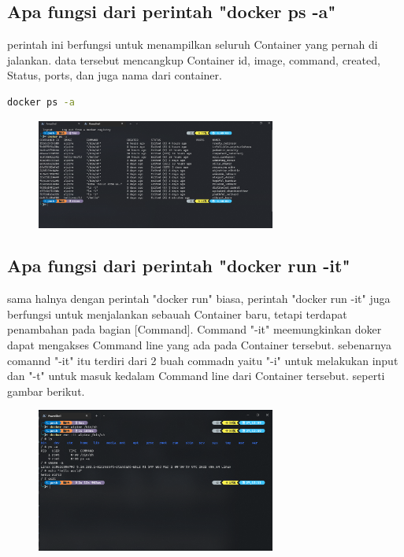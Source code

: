 \documentclass[11pt,a4paper]{article}
\begin{document}
\subsection{Apa fungsi dari perintah "docker ps -a"}
perintah ini berfungsi untuk menampilkan seluruh Container yang pernah di jalankan. 
data tersebut mencangkup Container id, image, command, created, Status, ports, dan juga nama dari container.
\begin{lstlisting}[language = bash]
	docker ps -a
\end{lstlisting}
\begin{figure}[h]
	\centering
	\includegraphics[width = 0.7\textwidth]{Figure/asset/ps-a.png}
\end{figure}


\subsection{Apa fungsi dari perintah "docker run -it"}
sama halnya dengan perintah "docker run" biasa, perintah "docker run -it" juga berfungsi untuk menjalankan
sebauah Container baru, tetapi terdapat penambahan pada bagian [Command]. Command "-it" meemungkinkan
doker dapat mengakses Command line yang ada pada Container tersebut. sebenarnya comannd "-it" itu terdiri 
dari 2 buah commadn yaitu "-i" untuk melakukan input dan "-t" untuk masuk kedalam Command line dari Container tersebut.
seperti gambar berikut.
\begin{figure}[h]
	\centering
	\includegraphics[width = 0.7\textwidth]{Figure/asset/docker_bin_sh.png}
\end{figure}
\end{document}
